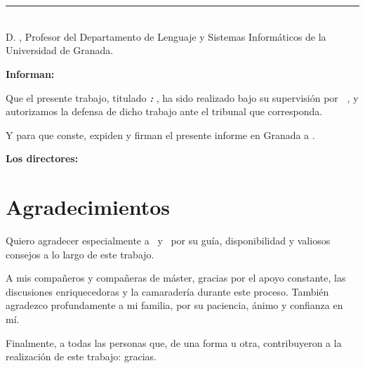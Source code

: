 \begin{flushright}
\myTime
\end{flushright}


\chapter*{}
\thispagestyle{empty}

\noindent\rule[-1ex]{\textwidth}{2pt}\\[4.5ex]

D. \textbf{\myProf}, Profesor del Departamento de Lenguaje y Sistemas Informáticos de la Universidad de Granada.

\vspace{0.5cm}

\vspace{0.5cm}

\textbf{Informan:}

\vspace{0.5cm}

Que el presente trabajo, titulado \textit{\textbf{\myTitle: \mySubTitle}}, ha sido realizado bajo su supervisión por \textbf{\myName \ }, y autorizamos la defensa de dicho trabajo ante el tribunal que corresponda.

\vspace{0.5cm}

Y para que conste, expiden y firman el presente informe en Granada a \myTime.

\vspace{1cm}

\textbf{Los directores:}

\vspace{5cm}

\noindent \textbf{\myProf}

\chapter*{Agradecimientos}
\thispagestyle{empty}

\vspace{1cm}


Quiero agradecer especialmente a \myProf\ y \myOtherProf\ por su guía, disponibilidad y valiosos consejos a lo largo de este trabajo.

\vspace{0.5cm}

\noindent A mis compañeros y compañeras de máster, gracias por el apoyo constante, las discusiones enriquecedoras y la camaradería durante este proceso. También agradezco profundamente a mi familia, por su paciencia, ánimo y confianza en mí.

\vspace{0.5cm}

\noindent Finalmente, a todas las personas que, de una forma u otra, contribuyeron a la realización de este trabajo: gracias.